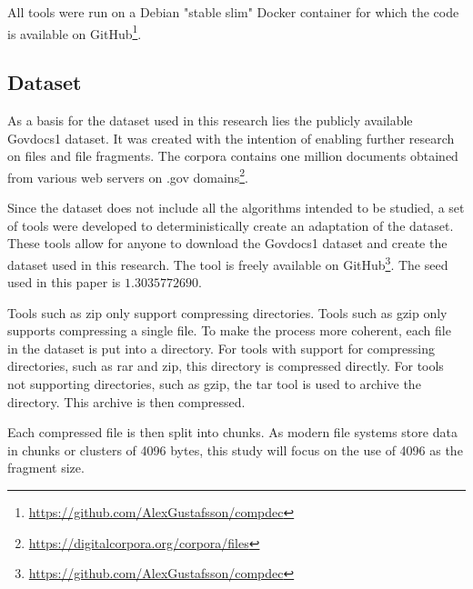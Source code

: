 \documentclass[conference]{IEEEtran}
\begin{document}
All tools were run on a Debian "stable slim" Docker container for which the code is available on GitHub\footnote{\href{https://github.com/AlexGustafsson/compdec}{https://github.com/AlexGustafsson/compdec}}.

\subsection{Dataset}
\label{method:dataset}

As a basis for the dataset used in this research lies the publicly available Govdocs1 dataset. It was created with the intention of enabling further research on files and file fragments. The corpora contains one million documents obtained from various web servers on .gov domains\footnote{\href{https://digitalcorpora.org/corpora/files}{https://digitalcorpora.org/corpora/files}}.

Since the dataset does not include all the algorithms intended to be studied, a set of tools were developed to deterministically create an adaptation of the dataset. These tools allow for anyone to download the Govdocs1 dataset and create the dataset used in this research. The tool is freely available on GitHub\footnote{\href{https://github.com/AlexGustafsson/compdec}{https://github.com/AlexGustafsson/compdec}}. The seed used in this paper is $1.3035772690$.

Tools such as zip only support compressing directories. Tools such as gzip only supports compressing a single file. To make the process more coherent, each file in the dataset is put into a directory. For tools with support for compressing directories, such as rar and zip, this directory is compressed directly. For tools not supporting directories, such as gzip, the tar tool is used to archive the directory. This archive is then compressed.

Each compressed file is then split into chunks. As modern file systems store data in chunks or clusters of 4096 bytes\cite{PENROSE2013}, this study will focus on the use of 4096 as the fragment size.

\end{document}
